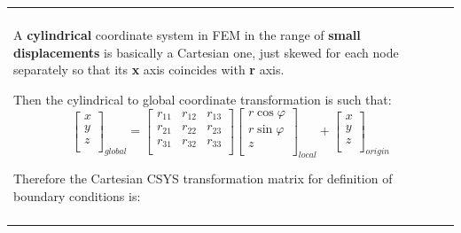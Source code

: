 \documentclass[10pt,b5paper,titlepage]{book}
\newenvironment{bbox}[1][0.96]
{
    \begin{center}
        \begin{tabular}{|p{#1\textwidth}|}
            \hline\\
}
{
            \\\\\hline
        \end{tabular}
    \end{center}
}
\begin{document}
\newpage
\begin{bbox}
    A \textbf{cylindrical} coordinate system in FEM in the range of \textbf{small}
    \textbf{displacements} is basically a Cartesian one, just skewed for each
    node separately so that its \textbf{x} axis coincides with \textbf{r} axis.

    Then the cylindrical to global coordinate transformation is such that:
    \begin{equation}
        \begin{bmatrix}
            x \\
            y \\
            z \\
        \end{bmatrix}_{global}
        = \begin{bmatrix}
            r_{11} & r_{12} & r_{13} \\
            r_{21} & r_{22} & r_{23} \\
            r_{31} & r_{32} & r_{33} \\
        \end{bmatrix}
        \begin{bmatrix}
            r \cos \varphi \\
            r \sin \varphi \\
            z \\
        \end{bmatrix}_{local}
        + \begin{bmatrix}
            x \\
            y \\
            z \\
        \end{bmatrix}_{origin}
    \end{equation}

    Therefore the Cartesian CSYS transformation matrix for definition of
    boundary conditions is:


\end{bbox}
\end{document}
